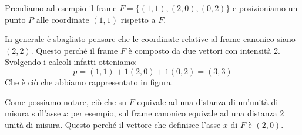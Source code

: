 \begin{example}
	Prendiamo ad esempio il frame $F = \{ (1, 1), (2, 0), (0, 2) \}$ e posizioniamo un punto $P$
	alle coordinate $(1, 1)$ rispetto a $F$.
	\begin{center}
	\end{center}
	In generale \`e sbagliato pensare che le coordinate relative al frame canonico siano
	$(2, 2)$. Questo perch\'e il frame $F$ \`e composto da due vettori con intensit\`a 2.
	Svolgendo i calcoli infatti otteniamo:
	\[ p = (1, 1) + 1 (2, 0) + 1 (0, 2) = (3, 3) \]
	Che \`e ci\`o che abbiamo rappresentato in figura.

	Come possiamo notare, ci\`o che su $F$ equivale ad una distanza di un'unit\`a di misura
	sull'asse $x$ per esempio, sul frame canonico equivale ad una distanza 2 unit\`a di misura.
	Questo perch\'e il vettore che definisce l'asse $x$ di $F$ \`e $(2, 0)$.
\end{example}


